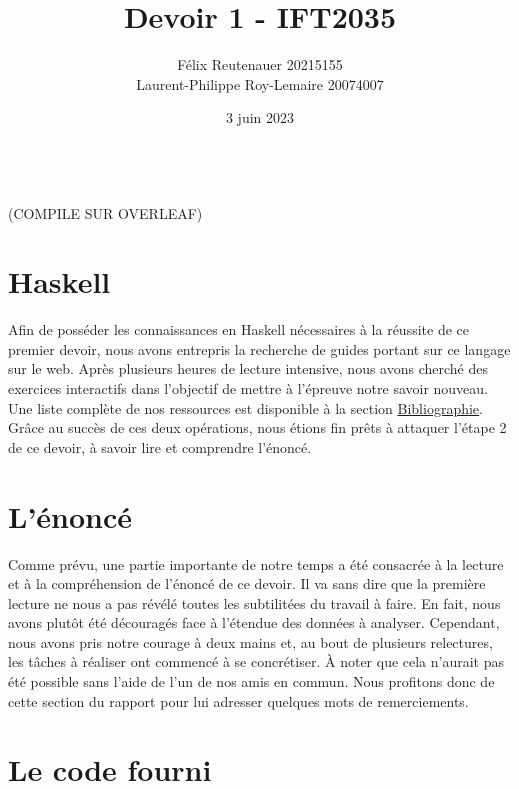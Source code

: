 \documentclass{article}
\title{Devoir 1 - IFT2035}
\author{
Félix Reutenauer 20215155
\\
Laurent-Philippe Roy-Lemaire 20074007}
\date{3 juin 2023}
\begin{document}
\\ (COMPILE SUR OVERLEAF) 

\maketitle

\section{Haskell}

Afin de posséder les connaissances en Haskell nécessaires à la réussite de ce premier devoir, nous avons entrepris la recherche de guides portant sur ce langage sur le web.
Après plusieurs heures de lecture intensive, nous avons cherché des exercices interactifs dans l'objectif de mettre à l'épreuve notre savoir nouveau.
Une liste complète de nos ressources est disponible à la section \hyperref[sec:biblio]{Bibliographie}.
Grâce au succès de ces deux opérations, nous étions fin prêts à attaquer l'étape 2 de ce devoir, à savoir lire et comprendre l'énoncé.

\section{L'énoncé}

Comme prévu, une partie importante de notre temps a été consacrée à la lecture et à la compréhension de l'énoncé de ce devoir.
Il va sans dire que la première lecture ne nous a pas révélé toutes les subtilitées du travail à faire.
En fait, nous avons plutôt été découragés face à l'étendue des données à analyser.
Cependant, nous avons pris notre courage à deux mains et, au bout de plusieurs relectures, les tâches à réaliser ont commencé à se concrétiser.
À noter que cela n’aurait pas été possible sans l’aide de l’un de nos amis en commun.
Nous profitons donc de cette section du rapport pour lui adresser quelques mots de remerciements.

\section{Le code fourni}
\end{document}
